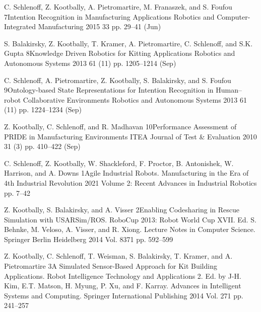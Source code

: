 \cvarticle
{C. Schlenoff, Z. Kootbally, A. Pietromartire, M. Franaszek, and S. Foufou} %
{7}{Intention Recognition in Manufacturing Applications} %
{Robotics and Computer-Integrated Manufacturing} %
{2015} %
{33} %
{} %
{pp. 29--41} %
{(Jun)} %

\cvarticle
{S. Balakirsky, Z. Kootbally, T. Kramer, A. Pietromartire, C. Schlenoff, and S.K. Gupta} %
{8}{Knowledge Driven Robotics for Kitting Applications} %
{Robotics and Autonomous Systems} %
{2013} %
{61} %
{(11)} %
{pp. 1205--1214} %
{(Sep)} %


\cvarticle
{C. Schlenoff, A. Pietromartire, Z. Kootbally, S. Balakirsky, and S. Foufou} %
{9}{Ontology-based State Representations for Intention Recognition in Human–robot Collaborative Environments} %
{Robotics and Autonomous Systems} %
{2013} %
{61} %
{(11)} %
{pp. 1224--1234} %
{(Sep)} %

\cvarticle
{Z. Kootbally, C. Schlenoff, and R. Madhavan} %
{10}{Performance Assessment of PRIDE in Manufacturing Environments} %
{ITEA Journal of Test \& Evaluation} %
{2010} %
{31} %
{(3)} %
{pp. 410--422} %
{(Sep)} %



\cvarticle
{C. Schlenoff, Z. Kootbally, W. Shackleford, F. Proctor, B. Antonishek, W. Harrison, and A. Downs} %
{1}{Agile Industrial Robots.} %
{Manufacturing in the Era of 4th Industrial Revolution} %
{2021} %
{Volume 2: Recent Advances in Industrial Robotics} %
{} %
{pp. 7--42} %
{} %


\cvarticle
{Z. Kootbally, S. Balakirsky, and A. Visser} %
{2}{Enabling Codesharing in Rescue Simulation with USARSim/ROS.} %
{RoboCup 2013: Robot World Cup XVII. Ed. S. Behnke, M. Veloso, A. Visser, and R. Xiong. Lecture Notes in Computer Science. Springer Berlin Heidelberg} %
{2014} %
{Vol. 8371} %
{} %
{pp. 592--599} %
{} %

\cvarticle
{Z. Kootbally, C. Schlenoff, T. Weisman, S. Balakirsky, T. Kramer, and A. Pietromartire} %
{3}{A Simulated Sensor-Based Approach for Kit Building Applications.} %
{Robot Intelligence Technology and Applications 2. Ed. by J-H. Kim, E.T. Matson, H. Myung, P. Xu, and F. Karray. Advances in Intelligent Systems and Computing. Springer International Publishing} %
{2014} %
{Vol. 271} %
{} %
{pp. 241--257} %
{} %

